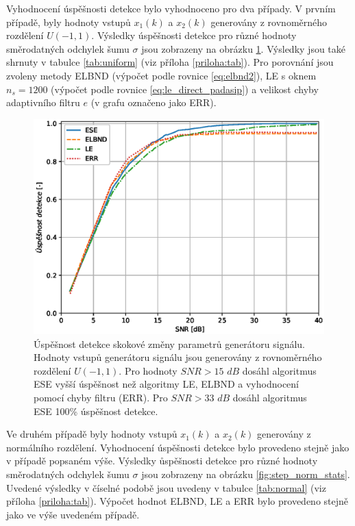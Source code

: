 Vyhodnocení úspěšnosti detekce bylo vyhodnoceno pro dva případy. V prvním případě, byly hodnoty vstupů $x_1(k)$ a $x_2(k)$ generovány z rovnoměrného rozdělení $U(-1,1)$. Výsledky úspěšnosti detekce pro různé hodnoty směrodatných odchylek šumu $\sigma$ jsou zobrazeny na obrázku \ref{fig:step_uni_stats}. Výsledky jsou také shrnuty v tabulce \ref{tab:uniform} (viz příloha \ref{priloha:tab}). Pro porovnání jsou zvoleny metody ELBND (výpočet podle rovnice \ref{eq:elbnd2}), LE s oknem $n_s=1200$ (výpočet podle rovnice \ref{eq:le_direct_padasip}) a velikost chyby adaptivního filtru $e$ (v grafu označeno jako ERR).

\begin{figure}[!ht]
    \centering
    \includegraphics[scale=0.66]{IMG/mdpi/stepuni_stats.eps}
    \caption{Úspěšnost detekce skokové změny parametrů generátoru signálu. Hodnoty vstupů generátoru signálu jsou generovány z rovnoměrného rozdělení $U(-1,1)$. 
Pro hodnoty $SNR > 15$ $dB$ dosáhl algoritmus ESE vyšší úspěšnost než algoritmy  LE, ELBND a vyhodnocení pomocí chyby filtru (ERR). Pro $SNR > 33$ $dB$ dosáhl algoritmus ESE 100\% úspěšnost detekce.}
    \label{fig:step_uni_stats}
\end{figure}
Ve druhém případě byly hodnoty vstupů $x_1(k)$ a $x_2(k)$ generovány z normálního rozdělení. Vyhodnocení úspěšnosti detekce bylo provedeno stejně jako v případě popsaném výše. Výsledky ůspěšnosti detekce pro různé hodnoty směrodatných odchylek šumu $\sigma$ jsou zobrazeny na obrázku \ref{fig:step_norm_stats}. Uvedené výsledky v číselné podobě jsou uvedeny v tabulce \ref{tab:normal} (viz příloha \ref{priloha:tab}). Výpočet hodnot ELBND, LE a ERR bylo provedeno stejně jako ve výše uvedeném případě.

